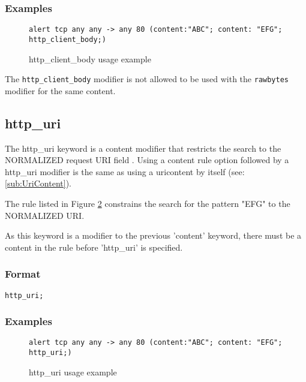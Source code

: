 \documentclass[english]{report}
\newenvironment{note}{
\samepage
    \vspace{10pt}{\textsf{
        {\hspace{7pt}\Huge{$\triangle$\hspace{-12.5pt}{\Large{$^!$}}}}\hspace{5pt}
        {\Large{NOTE}}
    }
    }
   \begin{center}
    \par\vspace{-17pt}

    \begin{lrbox}{\savepar}
    \begin{minipage}[r]{6in}
}
{
    \end{minipage}
    \end{lrbox}
    \fbox{
        \usebox{
            \savepar
	}
    }
    \par\vskip10pt
    \end{center}
}
\begin{document}
\subsubsection{Examples}

\begin{figure}[!hbpt]
\begin{verbatim}
alert tcp any any -> any 80 (content:"ABC"; content: "EFG"; http_client_body;)
\end{verbatim}
\caption{http\_client\_body usage example \label{fig:HttpClientBody}}
\end{figure}

\begin{note}
The \texttt{http\_client\_body} modifier is not allowed to be used with
the \texttt{rawbytes} modifier for the same content.
\end{note}


\subsection{http\_uri\label{sub:HttpUri}}

The http\_uri keyword is a content modifier that restricts
the search to the NORMALIZED request \textsc{URI} field .  Using a
content rule option followed by a http\_uri modifier is the
same as using a uricontent by itself (see: \ref{sub:UriContent}).

The rule listed in Figure \ref{fig:HttpUri} constrains the
search for the pattern "EFG" to the NORMALIZED URI.

As this keyword is a modifier to the previous 'content' keyword, there must be
a content in the rule before 'http\_uri' is specified.

\subsubsection{Format}

\begin{verbatim}
http_uri;
\end{verbatim}

\subsubsection{Examples}

\begin{figure}[!hbpt]
\begin{verbatim}
alert tcp any any -> any 80 (content:"ABC"; content: "EFG"; http_uri;)
\end{verbatim}
\caption{http\_uri usage example \label{fig:HttpUri}}
\end{figure}
\end{document}
